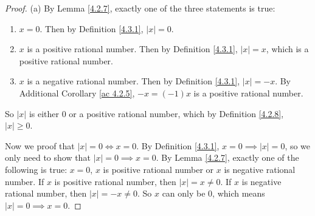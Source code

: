 \begin{proof}{(a)}
By Lemma \ref{4.2.7}, exactly one of the three statements is true:
\begin{enumerate}[label=(\roman*)]
    \item \(x = 0\).
    Then by Definition \ref{4.3.1}, \(|x| = 0\).
    \item \(x\) is a positive rational number.
    Then by Definition \ref{4.3.1}, \(|x| = x\), which is a positive rational number.
    \item \(x\) is a negative rational number.
    Then by Definition \ref{4.3.1}, \(|x| = -x\).
    By Additional Corollary \ref{ac 4.2.5}, \(-x = (-1)x\) is a positive rational number.
\end{enumerate}
So \(|x|\) is either \(0\) or a positive rational number, which by Definition \ref{4.2.8}, \(|x| \geq 0\).

Now we proof that \(|x| = 0 \iff x = 0\).
By Definition \ref{4.3.1}, \(x = 0 \implies |x| = 0\), so we only need to show that \(|x| = 0 \implies x = 0\).
By Lemma \ref{4.2.7}, exactly one of the following is true:
\(x = 0\), \(x\) is positive rational number or \(x\) is negative rational number.
If \(x\) is positive rational number, then \(|x| = x \neq 0\).
If \(x\) is negative rational number, then \(|x| = -x \neq 0\).
So \(x\) can only be \(0\), which means \(|x| = 0 \implies x = 0\).
\end{proof}

